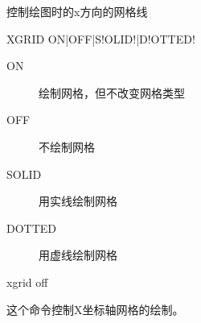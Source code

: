 \label{cmd:xgrid}

控制绘图时的x方向的网格线

\begin{SACSTX}
XGRID ON|OFF|S!OLID!|D!OTTED!
\end{SACSTX}

\begin{description}
\item [ON] 绘制网格，但不改变网格类型
\item [OFF] 不绘制网格
\item [SOLID] 用实线绘制网格
\item [DOTTED] 用虚线绘制网格
\end{description}

\begin{SACDFT}
xgrid off
\end{SACDFT}

这个命令控制X坐标轴网格的绘制。
